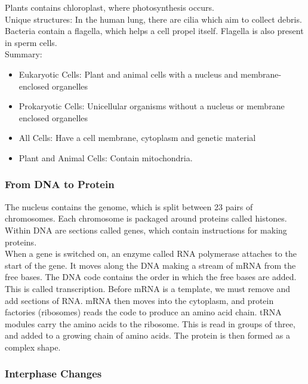 \noindent Plants contains chloroplast, where photosynthesis occurs. \\

\noindent Unique structures: In the human lung, there are cilia which aim to collect debris. Bacteria contain a flagella, which helps a cell propel itself. Flagella is also present in sperm cells. \\

Summary:

\begin{itemize}
    \itemsep0em
    \item Eukaryotic Cells: Plant and animal cells with a nucleus and membrane-enclosed organelles
    \item Prokaryotic Cells: Unicellular organisms without a nucleus or membrane enclosed organelles
    \item All Cells: Have a cell membrane, cytoplasm and genetic material
    \item Plant and Animal Cells: Contain mitochondria.
\end{itemize}




\subsubsection{From DNA to Protein}

The nucleus contains the genome, which is split between 23 pairs of chromosomes. Each chromosome is packaged around proteins called histones. Within DNA are sections called genes, which contain instructions for making proteins.\\ 

When a gene is switched on, an enzyme called RNA polymerase attaches to the start of the gene. It moves along the DNA making a stream of mRNA from the free bases. The DNA code contains the order in which the free bases are added. This is called transcription. Before mRNA is a template, we must remove and add sections of RNA. mRNA then moves into the cytoplasm, and protein factories (ribosomes) reads the code to produce an amino acid chain. tRNA modules carry the amino acids to the ribosome. This is read in groups of three, and added to a growing chain of amino acids. The protein is then formed as a complex shape.

\subsubsection{Interphase Changes}

